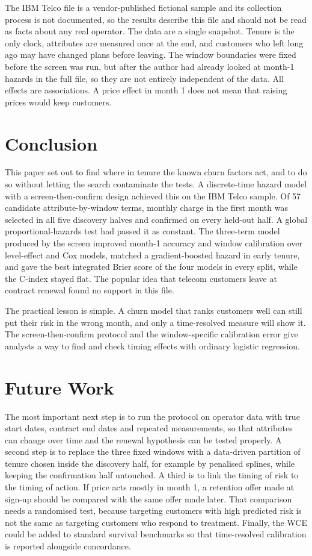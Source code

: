 \documentclass[conference]{IEEEtran}
\begin{document}
The IBM Telco file is a vendor-published fictional sample and its collection process is not documented, so the results describe this file and should not be read as facts about any real operator. The data are a single snapshot. Tenure is the only clock, attributes are measured once at the end, and customers who left long ago may have changed plans before leaving. The window boundaries were fixed before the screen was run, but after the author had already looked at month-1 hazards in the full file, so they are not entirely independent of the data. All effects are associations. A price effect in month 1 does not mean that raising prices would keep customers.

\section{Conclusion}

This paper set out to find where in tenure the known churn factors act, and to do so without letting the search contaminate the tests. A discrete-time hazard model with a screen-then-confirm design achieved this on the IBM Telco sample. Of 57 candidate attribute-by-window terms, monthly charge in the first month was selected in all five discovery halves and confirmed on every held-out half. A global proportional-hazards test had passed it as constant. The three-term model produced by the screen improved month-1 accuracy and window calibration over level-effect and Cox models, matched a gradient-boosted hazard in early tenure, and gave the best integrated Brier score of the four models in every split, while the C-index stayed flat. The popular idea that telecom customers leave at contract renewal found no support in this file.

The practical lesson is simple. A churn model that ranks customers well can still put their risk in the wrong month, and only a time-resolved measure will show it. The screen-then-confirm protocol and the window-specific calibration error give analysts a way to find and check timing effects with ordinary logistic regression.

\section{Future Work}

The most important next step is to run the protocol on operator data with true start dates, contract end dates and repeated measurements, so that attributes can change over time and the renewal hypothesis can be tested properly. A second step is to replace the three fixed windows with a data-driven partition of tenure chosen inside the discovery half, for example by penalised splines, while keeping the confirmation half untouched. A third is to link the timing of risk to the timing of action. If price acts mostly in month 1, a retention offer made at sign-up should be compared with the same offer made later. That comparison needs a randomised test, because targeting customers with high predicted risk is not the same as targeting customers who respond to treatment. Finally, the WCE could be added to standard survival benchmarks so that time-resolved calibration is reported alongside concordance.
\end{document}

